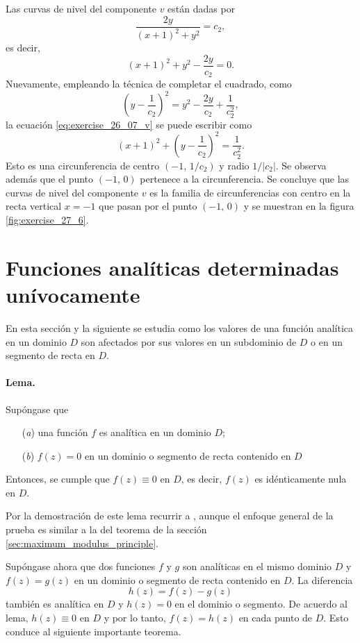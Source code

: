 \documentclass[a4paper]{report}
\begin{document}
Las curvas de nivel del componente \(v\) están dadas por 
\[
 \frac{2y}{(x+1)^2+y^2}=c_2,
\]
es decir,
\begin{equation}\label{eq:exercise_26_07_v}
 (x+1)^2+y^2-\frac{2y}{c_2}=0.
\end{equation}
Nuevamente, empleando la técnica de completar el cuadrado, como
\[
 \left(y-\frac{1}{c_2}\right)^2=y^2-\frac{2y}{c_2}+\frac{1}{c_2^2},
\]
la ecuación \ref{eq:exercise_26_07_v} se puede escribir como
\[
 (x+1)^2+\left(y-\frac{1}{c_2}\right)^2=\frac{1}{c_2^2}.
\]
Esto es una circunferencia de centro \((-1,\,1/c_2)\) y radio \(1/|c_2|\). Se observa además que el punto \((-1,\,0)\) pertenece a la circunferencia. Se concluye que las curvas de nivel del componente \(v\) es la familia de circunferencias con centro en la recta vertical \(x=-1\) que pasan por el punto \((-1,\,0)\) y se muestran en la figura \ref{fig:exercise_27_6}.

\section{Funciones analíticas determinadas unívocamente}\label{sec:uniquely_determined_analytic_functions}

En esta sección y la siguiente se estudia como los valores de una función analítica en un dominio \(D\) son afectados por sus valores en un subdominio de \(D\) o en un segmento de recta en \(D\). 

\paragraph{Lema.} Supóngase que 
\begin{enumerate}
 \item[(\textit{a})] una función \(f\) es analítica en un dominio \(D\);
 \item[(\textit{b})] \(f(z)=0\) en un dominio o segmento de recta contenido en \(D\)
\end{enumerate}
Entonces, se cumple que \(f(z)\equiv0\) en \(D\), es decir, \(f(z)\) es idénticamente nula en \(D\).

Por la demostración de este lema recurrir a \cite{brown2013complex}, aunque el enfoque general de la prueba es similar a la del teorema de la sección \ref{sec:maximum_modulus_principle}.

Supóngase ahora que dos funciones \(f\) y \(g\) son analíticas en el mismo dominio \(D\) y \(f(z)=g(z)\) en un dominio o segmento de recta contenido en \(D\). La diferencia
\[
 h(z)=f(z)-g(z)
\]
también es analítica en \(D\) y \(h(z)=0\) en el dominio o segmento. De acuerdo al lema, \(h(z)\equiv0\) en \(D\) y por lo tanto, \(f(z)=h(z)\) en cada punto de \(D\). Esto conduce al siguiente importante teorema.
\end{document}
